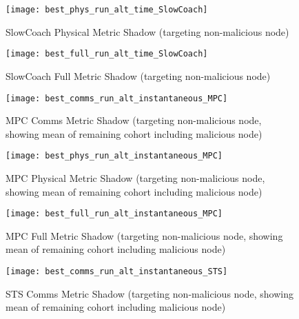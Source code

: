 \documentclass[aspectratio=43]{beamer}
\begin{document}
\begin{frame}\begin{figure}[h]
	\centering
	\texttt{[image: best\_phys\_run\_alt\_time\_SlowCoach]}
	\caption{SlowCoach Physical Metric Shadow (targeting non-malicious node)}
	\label{fig:phys_alt_time_slowcoach}
\end{figure}\end{frame}

\begin{frame}\begin{figure}[h]
	\centering
	\texttt{[image: best\_full\_run\_alt\_time\_SlowCoach]}
	\caption{SlowCoach Full Metric Shadow (targeting non-malicious node)}
	\label{fig:full_alt_time_slowcoach}
\end{figure}\end{frame}

\begin{frame}\begin{figure}[h]
	\centering
	\texttt{[image: best\_comms\_run\_alt\_instantaneous\_MPC]}
	\caption{MPC Comms Metric Shadow (targeting non-malicious node, showing mean of remaining cohort including malicious node)}
	\label{fig:comms_alt_instantaneous_mpc}
\end{figure}\end{frame}

\begin{frame}\begin{figure}[h]
	\centering
	\texttt{[image: best\_phys\_run\_alt\_instantaneous\_MPC]}
	\caption{MPC Physical Metric Shadow (targeting non-malicious node, showing mean of remaining cohort including malicious node)}
	\label{fig:phys_alt_instantaneous_mpc}
\end{figure}\end{frame}

\begin{frame}\begin{figure}[h]
	\centering
	\texttt{[image: best\_full\_run\_alt\_instantaneous\_MPC]}
	\caption{MPC Full Metric Shadow (targeting non-malicious node, showing mean of remaining cohort including malicious node)}
	\label{fig:full_alt_instantaneous_mpc}
\end{figure}\end{frame}


\begin{frame}\begin{figure}[h]
	\centering
	\texttt{[image: best\_comms\_run\_alt\_instantaneous\_STS]}
	\caption{STS Comms Metric Shadow (targeting non-malicious node, showing mean of remaining cohort including malicious node)}
	\label{fig:comms_alt_instantaneous_sts}
\end{figure}\end{frame}
\end{document}
